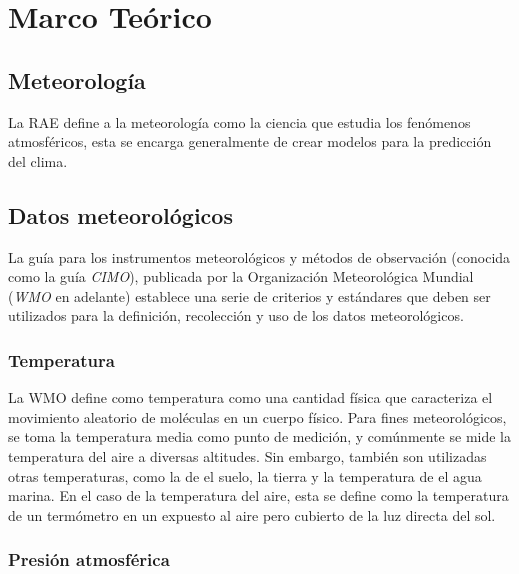 \section{Marco Teórico}



\subsection{Meteorología}

La RAE define a la meteorología como la ciencia que estudia los fenómenos atmosféricos, esta se encarga generalmente de crear modelos para la predicción del clima.

\subsection{Datos meteorológicos}

La guía para los instrumentos meteorológicos y métodos de observación (conocida como la guía \textit{CIMO}), publicada por la Organización Meteorológica Mundial (\textit{WMO} en adelante) establece una serie de criterios y estándares \cite{CIMO_2008} que deben ser utilizados para la definición, recolección y uso de los datos meteorológicos.

\subsubsection{Temperatura}
La WMO \cite{CIMO_2008} define como temperatura como una cantidad física que caracteriza el movimiento aleatorio de moléculas en un cuerpo físico. Para fines meteorológicos, se toma la temperatura media como punto de medición, y comúnmente se mide la temperatura del aire a diversas altitudes. Sin embargo, también son utilizadas otras temperaturas, como la de el suelo, la tierra y la temperatura de el agua marina. En el caso de la temperatura del aire, esta se define como la temperatura de un termómetro en un expuesto al aire pero cubierto de la luz directa del sol.

\subsubsection{Presión atmosférica}

